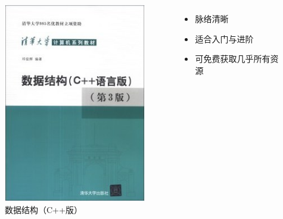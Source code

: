 \begin{frame}{\insertsubsectionhead}
    \begin{columns}
        \vspace{4ex}
        \begin{figure}
            \centering
            \includegraphics[height=0.6\textheight]{images/deng2013data.jpg}
            \caption{数据结构（C++版）\cite{deng2013data}}
            \label{fig:deng2013data}
        \end{figure}
        \begin{itemize}
            \item 脉络清晰
            \item 适合入门与进阶
            \item 可免费获取几乎所有资源
        \end{itemize}
    \end{columns}
\end{frame}

